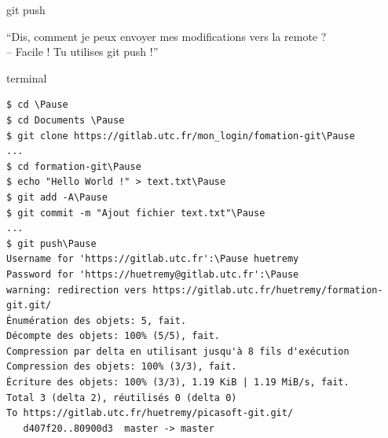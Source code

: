 \documentclass[usepdftitle=false]{beamer}
\newcommand{\Pause}{%
\ifdef{\Release}
  {\pause}
  {}
}
\begin{document}
\begin{frame}[fragile]{git push}
	\begin{block}{}
		\enquote{Dis, comment je peux envoyer mes modifications vers la remote ? \\ -- Facile ! Tu utilises git push !}
	\end{block}
	\begin{beamercolorbox}[rounded=true,shadow=true]{terminal}
		\begin{Verbatim}
$ cd \Pause
$ cd Documents \Pause
$ git clone https://gitlab.utc.fr/mon_login/fomation-git\Pause
...
$ cd formation-git\Pause
$ echo "Hello World !" > text.txt\Pause
$ git add -A\Pause
$ git commit -m "Ajout fichier text.txt"\Pause
...
$ git push\Pause
Username for 'https://gitlab.utc.fr':\Pause huetremy
Password for 'https://huetremy@gitlab.utc.fr':\Pause 
warning: redirection vers https://gitlab.utc.fr/huetremy/formation-git.git/
Énumération des objets: 5, fait.
Décompte des objets: 100% (5/5), fait.
Compression par delta en utilisant jusqu'à 8 fils d'exécution
Compression des objets: 100% (3/3), fait.
Écriture des objets: 100% (3/3), 1.19 KiB | 1.19 MiB/s, fait.
Total 3 (delta 2), réutilisés 0 (delta 0)
To https://gitlab.utc.fr/huetremy/picasoft-git.git/
   d407f20..80900d3  master -> master
		\end{Verbatim}
	\end{beamercolorbox}
\end{frame}
\end{document}

